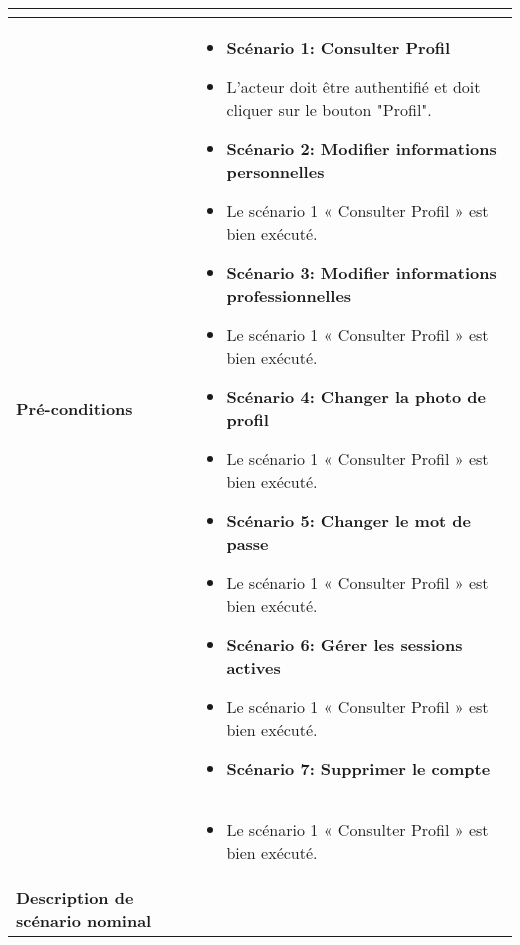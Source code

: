 \begin{longtable}{|>{\arraybackslash}p{4.2cm}|>{\arraybackslash}p{12.5cm}|}
\begin{itemize}[label=]
\end{itemize}\\

\hline
\textbf{Pré-conditions} &
\begin{itemize}[label=]
  \item\textbf{Scénario 1: Consulter Profil}
  \item L'acteur doit être authentifié et doit cliquer sur le bouton "Profil".
  \item\textbf{Scénario 2: Modifier informations personnelles}
  \item Le scénario 1 « Consulter Profil » est bien exécuté.
  \item\textbf{Scénario 3: Modifier informations professionnelles}
   \item Le scénario 1 « Consulter Profil » est bien exécuté.
  \item\textbf{Scénario 4: Changer la photo de profil}
  \item Le scénario 1 « Consulter Profil » est bien exécuté.
  \item\textbf{Scénario 5: Changer le mot de passe}
   \item Le scénario 1 « Consulter Profil » est bien exécuté.
  \item\textbf{Scénario 6: Gérer les sessions actives}
   \item Le scénario 1 « Consulter Profil » est bien exécuté.
   \item\textbf{Scénario 7: Supprimer le compte}

\end{itemize}\\

\hline
\textbf{}&
\begin{itemize}
    \item Le scénario 1 « Consulter Profil » est bien exécuté.
\end{itemize}\\
\hline
\textbf{Description de scénario nominal }  &
\begin{itemize}[label=]


\end{itemize}
\end{longtable}
